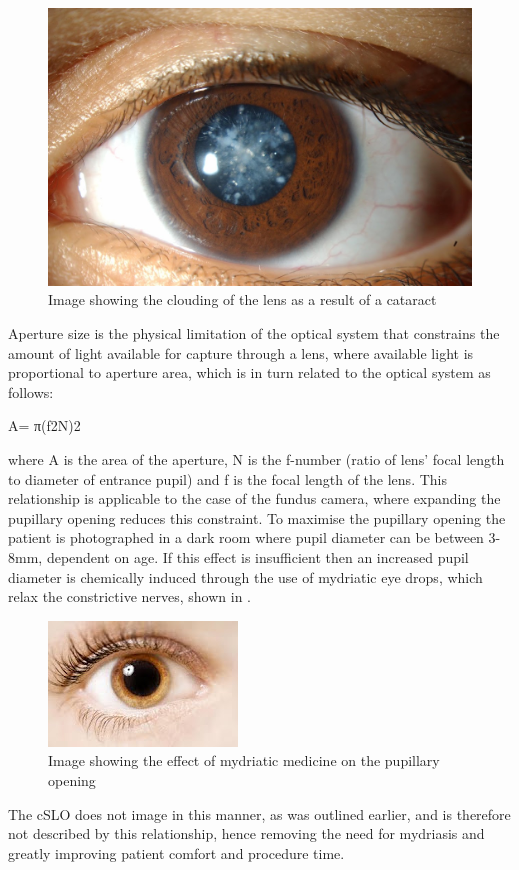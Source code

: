 \begin{figure}[htbp]
\centering
  \includegraphics{figures/cataract}
\caption{Image showing the clouding of the lens as a result of a cataract }
\label{fig:cat}
     \end{figure}

 
Aperture size is the physical limitation of the optical system that constrains the amount of light available for capture through a lens, where available light is proportional to aperture area, which is in turn related to the optical system as follows: 

A= π(f2N)2

where A is the area of the aperture, N is the f-number (ratio of lens’ focal length to diameter of entrance pupil) and f is the focal length of the lens. This relationship is applicable to the case of the fundus camera, where expanding the pupillary opening reduces this constraint. To maximise the pupillary opening the patient is photographed in a dark room where pupil diameter can be between 3-8mm, dependent on age. If this effect is insufficient then an increased pupil diameter is chemically induced through the use of mydriatic eye drops, which relax the constrictive nerves, shown in .

\begin{figure}[htbp]
\centering
  \includegraphics{figures/mydriasis}
\caption{Image showing the effect of mydriatic medicine on the pupillary opening}
\label{fig:myd}
     \end{figure}
The cSLO does not image in this manner, as was outlined earlier, and is therefore not described by this relationship, hence removing the need for mydriasis and greatly improving patient comfort and procedure time. 

